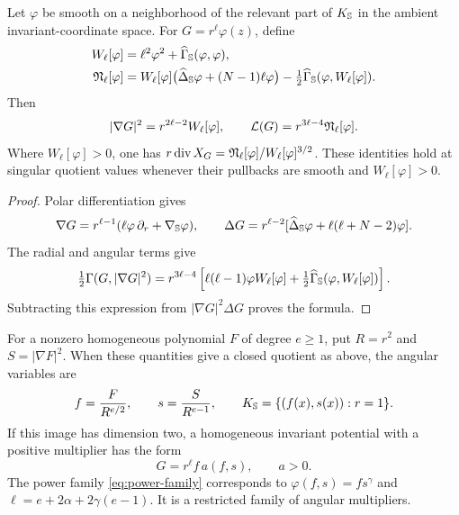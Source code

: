 \begin{proposition}
\label{prop:spherical-quotient-potential}
Let $\varphi$ be smooth on a neighborhood of the relevant part of
$K_{\mathbb S}$ in the ambient invariant-coordinate space.
For \(G=r^\ell \varphi(z)\), define
\begin{align}
 W_\ell[\varphi]&=\ell^2\varphi^2+\widehat\Gamma_{\mathbb S}(\varphi,\varphi),
 \label{eq:general-spherical-W}\\
 \mathfrak N_\ell[\varphi]
 &=W_\ell[\varphi]\bigl(\widehat\Delta_{\mathbb S}\varphi+(N-1)\ell \varphi\bigr)
       -\tfrac12\widehat\Gamma_{\mathbb S}(\varphi,W_\ell[\varphi]).
 \label{eq:general-spherical-N}
\end{align}
Then
\begin{equation}\label{eq:general-spherical-L}
 |\nabla G|^2=r^{2\ell-2}W_\ell[\varphi],\qquad
 \mathcal L(G)=r^{3\ell-4}\mathfrak N_\ell[\varphi].
\end{equation}
Where \(W_\ell[\varphi]>0\), one has
\(r\operatorname{div} X_G=\mathfrak N_\ell[\varphi]/W_\ell[\varphi]^{3/2}\).
These identities hold at singular quotient values whenever their
pullbacks are smooth and \(W_\ell[\varphi]>0\).
\end{proposition}

\begin{proof}
Polar differentiation gives
\[
 \nabla G=r^{\ell-1}(\ell \varphi\,\partial_r+\nabla_{\mathbb S}\varphi),\qquad
 \Delta G=r^{\ell-2}
       [\widehat\Delta_{\mathbb S}\varphi+\ell(\ell+N-2)\varphi].
\]
The radial and angular terms give
\[
 \tfrac12\Gamma(G,|\nabla G|^2)
 =r^{3\ell-4}\left[
  \ell(\ell-1)\varphi W_\ell[\varphi]
  +\tfrac12\widehat\Gamma_{\mathbb S}(\varphi,W_\ell[\varphi])\right].
\]
Subtracting this expression from \(|\nabla G|^2\Delta G\) proves the formula.
\end{proof}

For a nonzero homogeneous polynomial \(F\) of degree \(e\geq1\),
put \(R=r^2\) and \(S=|\nabla F|^2\).
When these quantities give a closed quotient as above, the angular
variables are
\begin{equation}\label{eq:rank-two-general-variables}
 f=\frac{F}{R^{e/2}},\qquad
 s=\frac{S}{R^{e-1}},\qquad K_{\mathbb S}=\{(f(x),s(x)):r=1\}.
\end{equation}
If this image has dimension two, a homogeneous invariant potential
with a positive multiplier has the form
\[
 G=r^\ell f\,a(f,s),\qquad a>0.
\]
The power family \eqref{eq:power-family} corresponds to
\(\varphi(f,s)=fs^\gamma\) and
\(\ell=e+2\alpha+2\gamma(e-1)\).  It is a restricted family of
angular multipliers.

